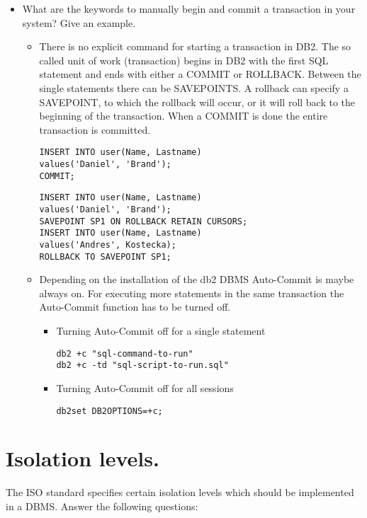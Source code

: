 \documentclass{vldb}
\begin{document}
\begin{itemize}
\item What are the keywords to manually begin and commit a transaction in your system? Give an example.
\begin{itemize}
\item There is no explicit command for starting a transaction in DB2. The so called unit of work (transaction) begins in DB2 with the 
first SQL statement and ends with either a COMMIT or ROLLBACK. Between the single statements there can be SAVEPOINTS. 
A rollback can specify a SAVEPOINT, to which the rollback will occur, or it will roll back to the beginning of the transaction.
When a COMMIT is done the entire transaction is committed.
\begin{verbatim}
INSERT INTO user(Name, Lastname) 
values('Daniel', 'Brand');
COMMIT;
\end{verbatim}
\begin{verbatim}
INSERT INTO user(Name, Lastname) 
values('Daniel', 'Brand');
SAVEPOINT SP1 ON ROLLBACK RETAIN CURSORS;
INSERT INTO user(Name, Lastname)
values('Andres', Kostecka);
ROLLBACK TO SAVEPOINT SP1;
\end{verbatim}
\end{itemize}
\begin{itemize}
\item Depending on the installation of the db2 DBMS Auto-Commit is maybe always on. For executing more statements in the same transaction the Auto-Commit
function has to be turned off.
\begin{itemize}
\item Turning Auto-Commit off for a single statement
\begin{verbatim}
db2 +c "sql-command-to-run"
db2 +c -td "sql-script-to-run.sql"
\end{verbatim}
\item Turning Auto-Commit off for all sessions
\begin{verbatim}
db2set DB2OPTIONS=+c;
\end{verbatim}
\end{itemize}
\end{itemize}
\end{itemize}

\section{Isolation levels.}

The ISO standard specifies certain isolation levels which should be implemented in a DBMS. Answer the following questions:
\end{document}
